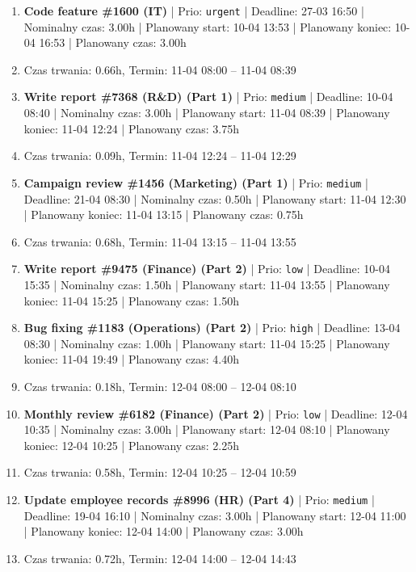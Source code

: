 {\begin{enumerate}
  \item [\textbf{14605}] \textbf{Code feature \#1600 (IT)} | Prio: \texttt{urgent} | Deadline: 27-03 16:50 | Nominalny czas: 3.00h | Planowany start: 10-04 13:53 | Planowany koniec: 10-04 16:53 | Planowany czas: 3.00h
  \item [\textbf{PRZERWA}] Czas trwania: 0.66h, Termin: 11-04 08:00 -- 11-04 08:39
  \item [\textbf{14633}] \textbf{Write report \#7368 (R\&D) (Part 1)} | Prio: \texttt{medium} | Deadline: 10-04 08:40 | Nominalny czas: 3.00h | Planowany start: 11-04 08:39 | Planowany koniec: 11-04 12:24 | Planowany czas: 3.75h
  \item [\textbf{PRZERWA}] Czas trwania: 0.09h, Termin: 11-04 12:24 -- 11-04 12:29
  \item [\textbf{14653}] \textbf{Campaign review \#1456 (Marketing) (Part 1)} | Prio: \texttt{medium} | Deadline: 21-04 08:30 | Nominalny czas: 0.50h | Planowany start: 11-04 12:30 | Planowany koniec: 11-04 13:15 | Planowany czas: 0.75h
  \item [\textbf{PRZERWA}] Czas trwania: 0.68h, Termin: 11-04 13:15 -- 11-04 13:55
  \item [\textbf{14685}] \textbf{Write report \#9475 (Finance) (Part 2)} | Prio: \texttt{low} | Deadline: 10-04 15:35 | Nominalny czas: 1.50h | Planowany start: 11-04 13:55 | Planowany koniec: 11-04 15:25 | Planowany czas: 1.50h
  \item [\textbf{14613}] \textbf{Bug fixing \#1183 (Operations) (Part 2)} | Prio: \texttt{high} | Deadline: 13-04 08:30 | Nominalny czas: 1.00h | Planowany start: 11-04 15:25 | Planowany koniec: 11-04 19:49 | Planowany czas: 4.40h
  \item [\textbf{PRZERWA}] Czas trwania: 0.18h, Termin: 12-04 08:00 -- 12-04 08:10
  \item [\textbf{14690}] \textbf{Monthly review \#6182 (Finance) (Part 2)} | Prio: \texttt{low} | Deadline: 12-04 10:35 | Nominalny czas: 3.00h | Planowany start: 12-04 08:10 | Planowany koniec: 12-04 10:25 | Planowany czas: 2.25h
  \item [\textbf{PRZERWA}] Czas trwania: 0.58h, Termin: 12-04 10:25 -- 12-04 10:59
  \item [\textbf{14655}] \textbf{Update employee records \#8996 (HR) (Part 4)} | Prio: \texttt{medium} | Deadline: 19-04 16:10 | Nominalny czas: 3.00h | Planowany start: 12-04 11:00 | Planowany koniec: 12-04 14:00 | Planowany czas: 3.00h
  \item [\textbf{PRZERWA}] Czas trwania: 0.72h, Termin: 12-04 14:00 -- 12-04 14:43

\end{enumerate}}
